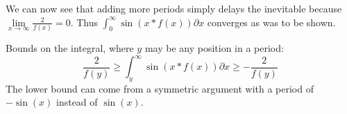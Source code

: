 \documentclass[]{article}
\newcommand{\pqty}[1]{{\left(#1\right)}}
\numberwithin{equation}{section}
\begin{document}
	We can now see that adding more periods simply delays the inevitable because \(\lim\limits_{x\to\infty}\frac{2}{f\pqty{x}}=0\). Thus \(\int_{0}^{\infty}\sin\pqty{x*f\pqty{x}}\partial x\) converges as was to be shown.

	Bounds on the integral, where \(y\) may be any position in a period:
	\begin{equation}
	\frac{2}{f\pqty{y}}
	\geq
	\int_{y}^{\infty}\sin\pqty{x*f\pqty{x}}\partial x
	\geq
	-\frac{2}{f\pqty{y}}
	\end{equation}
	The lower bound can come from a symmetric argument with a period of \(-\sin\pqty{x}\) instead of \(\sin\pqty{x}\).
\end{document}
